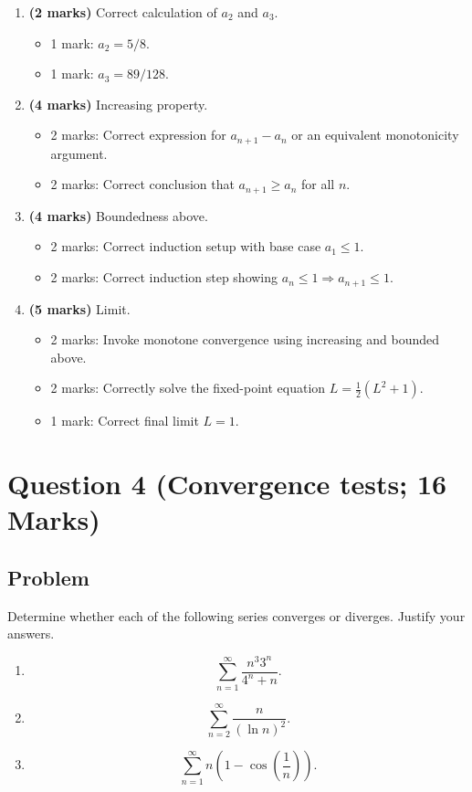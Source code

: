 \documentclass[12pt]{article}
\begin{document}
\begin{enumerate}[label=(\roman*)]
\item \textbf{(2 marks)} Correct calculation of $a_2$ and $a_3$.
\begin{itemize}
\item 1 mark: $a_2=5/8$.
\item 1 mark: $a_3=89/128$.
\end{itemize}

\item \textbf{(4 marks)} Increasing property.
\begin{itemize}
\item 2 marks: Correct expression for $a_{n+1}-a_n$ or an equivalent monotonicity argument.
\item 2 marks: Correct conclusion that $a_{n+1}\geq a_n$ for all $n$.
\end{itemize}

\item \textbf{(4 marks)} Boundedness above.
\begin{itemize}
\item 2 marks: Correct induction setup with base case $a_1\leq 1$.
\item 2 marks: Correct induction step showing $a_n\leq 1\Rightarrow a_{n+1}\leq 1$.
\end{itemize}

\item \textbf{(5 marks)} Limit.
\begin{itemize}
\item 2 marks: Invoke monotone convergence using increasing and bounded above.
\item 2 marks: Correctly solve the fixed-point equation $L=\frac12(L^2+1)$.
\item 1 mark: Correct final limit $L=1$.
\end{itemize}
\end{enumerate}

\newpage
\section{Question 4 (Convergence tests; 16 Marks)}

\subsection{Problem}

Determine whether each of the following series converges or diverges. Justify your answers.
\begin{enumerate}[label=(\alph*)]
\item
\[
\sum_{n=1}^{\infty}\frac{n^3 3^n}{4^n+n}.
\]

\item
\[
\sum_{n=2}^{\infty}\frac{n}{(\ln n)^2}.
\]

\item
\[
\sum_{n=1}^{\infty}n\left(1-\cos\left(\frac1n\right)\right).
\]
\end{enumerate}
\end{document}
